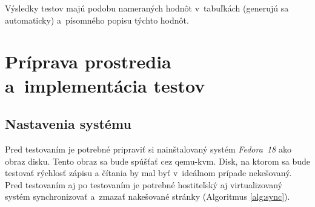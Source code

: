 Výsledky testov majú podobu nameraných hodnôt v~tabuľkách (generujú sa
automaticky) a~písomného popisu týchto hodnôt.


%
%

\chapter{Príprava prostredia a~implementácia testov}

\section{Nastavenia systému}

Pred testovaním je potrebné pripraviť si nainštalovaný systém \emph{Fedora~18}
ako obraz disku. Tento obraz sa bude spúšťať cez qemu-kvm. Disk, na ktorom sa
bude testovať rýchlosť zápisu a čítania by mal byť v~ideálnom prípade
nekešovaný.  Pred testovaním aj po testovaním je potrebné hostiteľský aj
virtualizovaný systém synchronizovať a~zmazať nakešované stránky (Algoritmus
\ref{alg:sync}).


